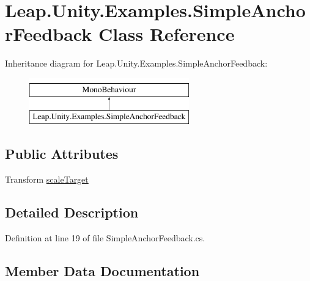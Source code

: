 \hypertarget{class_leap_1_1_unity_1_1_examples_1_1_simple_anchor_feedback}{}\section{Leap.\+Unity.\+Examples.\+Simple\+Anchor\+Feedback Class Reference}
\label{class_leap_1_1_unity_1_1_examples_1_1_simple_anchor_feedback}
Inheritance diagram for Leap.\+Unity.\+Examples.\+Simple\+Anchor\+Feedback\+:\begin{figure}[H]
\begin{center}
\leavevmode
\includegraphics[height=2.000000cm]{class_leap_1_1_unity_1_1_examples_1_1_simple_anchor_feedback}
\end{center}
\end{figure}
\subsection*{Public Attributes}
\begin{DoxyCompactItemize}
\item 
Transform \mbox{\hyperlink{class_leap_1_1_unity_1_1_examples_1_1_simple_anchor_feedback_a6a07cdf141b37052d18eb94c405abd2e}{scale\+Target}}
\end{DoxyCompactItemize}


\subsection{Detailed Description}


Definition at line 19 of file Simple\+Anchor\+Feedback.\+cs.



\subsection{Member Data Documentation}
\mbox{\label{class_leap_1_1_unity_1_1_examples_1_1_simple_anchor_feedback_a6a07cdf141b37052d18eb94c405abd2e}} 
